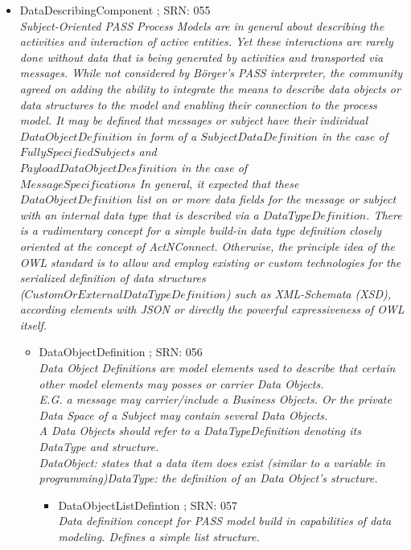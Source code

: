 \begin{itemize}
\begin{itemize}
	\item DataDescribingComponent ; SRN: 055 \\ \textit{Subject-Oriented PASS Process Models are in general about describing the activities and interaction of active entities. Yet these interactions are rarely done without data that is being generated by activities and transported via messages. While not considered by Börger's PASS interpreter, the community agreed on adding the ability to integrate the means to describe data objects or data structures to the model and enabling their connection to the process model. It may be defined that messages or subject have their individual $DataObjectDefinition$ in form of a $SubjectDataDefinition$ in the case of $FullySpecifiedSubject$s and \\ $PayloadDataObjectDesfinition$ in the case of \\ $MessageSpecifications$ In general, it expected that these \\ $DataObjectDefinition$ list on or more data fields for the message or subject with an internal data type that is described via a $DataTypeDefinition$. There is a rudimentary concept for a simple build-in data type definition closely oriented at the concept of ActNConnect. Otherwise, the principle idea of the OWL standard is to allow and employ existing or custom technologies for the serialized definition of data structures \\ ($CustomOrExternalDataTypeDefinition$) such as XML-Schemata (XSD), according elements with JSON or directly the powerful expressiveness of OWL itself.}
	\begin{itemize}
		\item DataObjectDefinition ; SRN: 056 \\ \textit{Data Object Definitions are model elements used to describe that certain other model elements may posses or carrier Data Objects.\\ E.G. a message may carrier/include a Business Objects. Or the private Data Space of a Subject may contain several Data Objects. \\A Data Objects should refer to a DataTypeDefinition denoting its DataType and structure.\\ DataObject: states that a data item does exist (similar to a variable in programming)DataType: the definition of an Data Object's structure.}
		\begin{itemize}
			\item DataObjectListDefintion ; SRN: 057 \\ \textit{Data definition concept for PASS model build in capabilities of data modeling. Defines a simple list structure.}

\end{itemize}
\end{itemize}
\end{itemize}
\end{itemize}
